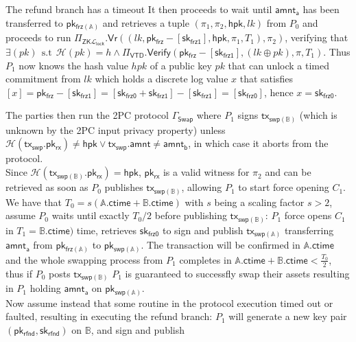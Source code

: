 \documentclass{article}      	%
\begin{document}
The refund branch has a timeout 
It then proceeds to wait until $\mathsf{amnt_a}$ has been transferred to $\mathsf{pk_{frz(\mathbb{A})}}$ and retrieves a tuple $(\pi_1, \pi_2, \mathsf{hpk}, lk)$ from $P_0$ and proceeds to run $\Pi_{\mathsf{ZK}\mathcal{L}_{\mathsf{lock}}}.\mathsf{Vr}((lk, \mathsf{pk_{frz}} - [\mathsf{sk_{frz1}}], \mathsf{hpk}, \pi_1, T_1), \pi_2)$, verifying that $\exists(pk) \:\: \text{s.t} \:\: \mathcal{H}(pk) = h \land \Pi_\mathsf{VTD}.\mathsf{Verify}(\mathsf{pk_{frz}} - [\mathsf{sk_{frz1}}], (lk \oplus pk), \pi, T_1)$. Thus $P_1$ now knows the hash value $hpk$ of a public key $pk$ that can unlock a timed commitment from $lk$ which holds a discrete log value $x$ that satisfies  $[x] = \mathsf{pk_{frz}} - [\mathsf{sk_{frz1}}] = [\mathsf{sk_{frz0}} + \mathsf{sk_{frz1}}] - [\mathsf{sk_{frz1}}] = [\mathsf{sk_{frz0}}]$, hence $x = \mathsf{sk_{frz0}}$.

The parties then run the 2PC protocol $\Gamma_{\mathsf{Swap}}$ where $P_1$ signs $\mathsf{tx_{swp(\mathbb{B})}}$ (which is unknown by the 2PC input privacy property) unless $\mathcal{H}(\mathsf{tx_{swp}}.\mathsf{pk_{rx}}) \neq \mathsf{hpk} \lor  \mathsf{tx_{swp}}.\mathsf{amnt} \neq \mathsf{amnt_b}$, in which case it aborts from the protocol. \\

Since $\mathcal{H}(\mathsf{tx_{swp(\mathbb{B})}}.\mathsf{pk_{rx}}) = \mathsf{hpk}$,  $\mathsf{pk_{rx}}$ is a valid witness for $\pi_2$ and can be retrieved as soon as $P_0$ publishes $\mathsf{tx_{swp(\mathbb{B})}}$, allowing $P_1$ to start force opening $C_1$. \\
We have that $T_0 = s(\mathbb{A}.\mathsf{ctime} + \mathbb{B}.\mathsf{ctime})$ with $s$ being a scaling factor $s > 2$, assume $P_0$ waits until exactly $T_0/2$ before publishing $\mathsf{tx_{swp(\mathbb{B})}}$: $P_1$ force opens $C_1$ in $T_1 = \mathbb{B}.\mathsf{ctime})$ time, retrieves $\mathsf{sk_{frz0}}$ to sign and publish $\mathsf{tx_{swp(\mathbb{A})}}$ transferring $\mathsf{amnt_a}$ from $\mathsf{pk_{frz(\mathbb{A})}}$ to $\mathsf{pk_{swp(\mathbb{A})}}$. The transaction will be confirmed in $\mathbb{A}.\mathsf{ctime}$ and the whole swapping process from $P_1$ completes in $\mathbb{A}.\mathsf{ctime} + \mathbb{B}.\mathsf{ctime} < \frac{T_0}{2}$, thus if $P_0$ posts $\mathsf{tx_{swp(\mathbb{B})}}$ $P_1$ is guaranteed to successfly swap their assets resulting in $P_1$ holding $\mathsf{amnt_a}$ on $\mathsf{pk_{swp(\mathbb{A})}}$. \\

Now assume instead that some routine in the protocol execution timed out or faulted, resulting in executing the refund branch: $P_1$ will generate a new key pair $(\mathsf{pk_{rfnd}}, \mathsf{sk_{rfnd}})$ on $\mathbb{B}$, and sign and publish
\end{document}
